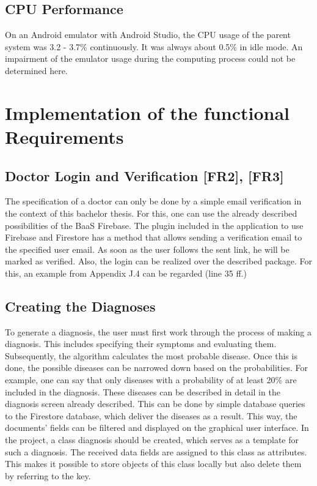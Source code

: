 \subsection{CPU Performance}
On an Android emulator with Android Studio, the CPU usage of the parent system was 3.2 - 3.7\% continuously. It was always about 0.5\% in idle mode. An impairment of the emulator usage during the computing process could not be determined here.

\section{Implementation of the functional Requirements}
\subsection{Doctor Login and Verification [FR2], [FR3]}
The specification of a doctor can only be done by a simple email verification in the context of this bachelor thesis. For this, one can use the already described possibilities of the BaaS Firebase. The plugin included in the application to use Firebase and Firestore has a method that allows sending a verification email to the specified user email. As soon as the user follows the sent link, he will be marked as verified. Also, the login can be realized over the described package. For this, an example from Appendix J.4 can be regarded (line 35 ff.)
\subsection{Creating the Diagnoses}
To generate a diagnosis, the user must first work through the process of making a diagnosis. This includes specifying their symptoms and evaluating them. Subsequently, the algorithm calculates the most probable disease. Once this is done, the possible diseases can be narrowed down based on the probabilities. For example, one can say that only diseases with a probability of at least 20\% are included in the diagnosis. These diseases can be described in detail in the diagnosis screen already described. This can be done by simple database queries to the Firestore database, which deliver the diseases as a result. This way, the documents' fields can be filtered and displayed on the graphical user interface. In the project, a class diagnosis should be created, which serves as a template for such a diagnosis. The received data fields are assigned to this class as attributes. This makes it possible to store objects of this class locally but also delete them by referring to the key.
